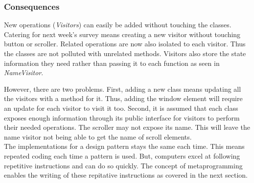 \subsubsection{Consequences}
New operations (\textit{Visitors}) can easily be added without touching the classes.
Catering for next week's survey means creating a new visitor without touching button or scroller.
Related operations are now also isolated to each visitor.
Thus the classes are not polluted with unrelated methods.
Visitors also store the state information they need rather than passing it to each function as seen in \textit{NameVisitor}.

However, there are two problems.
First, adding a new class means updating all the visitors with a method for it.
Thus, adding the window element will require an update for each visitor to visit it too.
Second, it is assumed that each class exposes enough information through its public interface for visitors to perform their needed operations.
The scroller may not expose its name.
This will leave the name visitor not being able to get the name of scroll elements.\\

The implementations for a design pattern stays the same each time.
This means repeated coding each time a pattern is used.
But, computers excel at following repetitive instructions and can do so quickly.
The concept of metaprogramming enables the writing of these repitative instructions as covered in the next section.